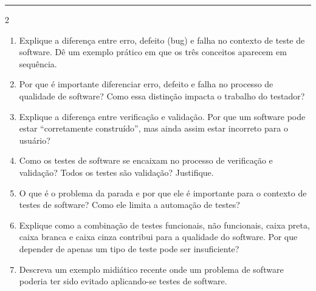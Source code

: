 \documentclass[a4paper,12pt]{article}
\begin{document}
\vspace{0.5cm}
\noindent\rule{\textwidth}{1pt}

\begin{multicols}{2}
\raggedcolumns

\begin{enumerate}[leftmargin=*]

\item Explique a diferença entre erro, defeito (bug) e falha no contexto de teste de software. Dê um exemplo prático em que os três conceitos aparecem em sequência.

\vspace{0.2cm}

\item Por que é importante diferenciar erro, defeito e falha no processo de qualidade de software? Como essa distinção impacta o trabalho do testador?

\vspace{0.2cm}

\item Explique a diferença entre verificação e validação. Por que um software pode estar “corretamente construído”, mas ainda assim estar incorreto para o usuário?

\vspace{0.2cm}

\item Como os testes de software se encaixam no processo de verificação e validação? Todos os testes são validação? Justifique.

\vspace{0.2cm}

\item O que é o problema da parada e por que ele é importante para o contexto de testes de software? Como ele limita a automação de testes?

\vspace{0.2cm}

\item Explique como a combinação de testes funcionais, não funcionais, caixa preta, caixa branca e caixa cinza contribui para a qualidade do software. Por que depender de apenas um tipo de teste pode ser insuficiente?

\vspace{0.2cm}

\item Descreva um exemplo midiático recente onde um problema de software poderia ter sido evitado aplicando-se testes de software.

\vspace{0.2cm}


\end{enumerate}
\end{multicols}
\end{document}
